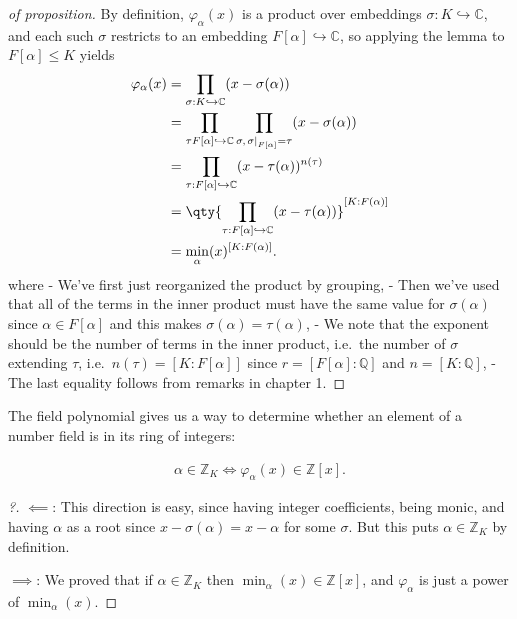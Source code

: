\begin{proof}[of proposition]

By definition, \(\varphi_{ \alpha}(x)\) is a product over embeddings
\(\sigma:K \hookrightarrow{\mathbb{C}}\), and each such \(\sigma\)
restricts to an embedding \(F[ \alpha] \hookrightarrow{\mathbb{C}}\), so
applying the lemma to \(F[ \alpha] \leq K\) yields
\begin{align*}
\varphi_{ \alpha}(x) 
&= \prod_{ \sigma: K\hookrightarrow{\mathbb{C}}} (x - \sigma( \alpha) ) \\
&= \prod_{ \tau F[ \alpha] \hookrightarrow{\mathbb{C}}} \prod_{ \sigma, { \left.{{ \sigma}} \right|_{{ F[ \alpha ] }} } = \tau } (x - \sigma( \alpha) ) \\
&= \prod_{ \tau: F[ \alpha ] \hookrightarrow{\mathbb{C}}} (x - \tau( \alpha ) )^{n(\tau)} \\
&= \qty{ \prod_{ \tau: F[ \alpha] \hookrightarrow{\mathbb{C}}} (x - \tau( \alpha ) ) }^{[K: F(\alpha)]} \\
&= \min_ \alpha(x) ^{[ K : F( \alpha ) ] }
.\end{align*}
where - We've first just reorganized the product by grouping, - Then
we've used that all of the terms in the inner product must have the same
value for \(\sigma( \alpha)\) since \(\alpha\in F[ \alpha]\) and this
makes \(\sigma( \alpha) = \tau( \alpha)\), - We note that the exponent
should be the number of terms in the inner product, i.e.~the number of
\(\sigma\) extending \(\tau\), i.e.~\(n(\tau) = [K: F[ \alpha] ]\) since
\(r = [F[ \alpha] : {\mathbb{Q}}]\) and \(n = [K: {\mathbb{Q}}]\), - The
last equality follows from remarks in chapter 1.

\end{proof}

\begin{remark}

The field polynomial gives us a way to determine whether an element of a
number field is in its ring of integers:

\end{remark}

\begin{proposition}[?]

\begin{align*}
\alpha\in {\mathbb{Z}}_K \iff \varphi_{ \alpha}(x) \in {\mathbb{Z}}[x]
.\end{align*}

\end{proposition}

\begin{proof}[?]

\(\impliedby\): This direction is easy, since having integer
coefficients, being monic, and having \(\alpha\) as a root since
\(x - \sigma( \alpha) = x - \alpha\) for some \(\sigma\). But this puts
\(\alpha \in {\mathbb{Z}}_K\) by definition.

\(\implies\): We proved that if \(\alpha\in {\mathbb{Z}}_K\) then
\(\min_ \alpha(x) \in {\mathbb{Z}}[x]\), and \(\varphi_{ \alpha}\) is
just a power of \(\min_ \alpha(x)\).

\end{proof}

